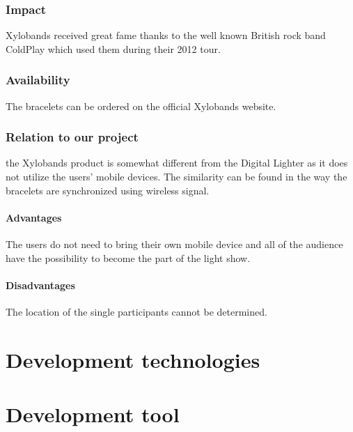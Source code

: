 \subsubsection{Impact}
Xylobands received great fame thanks to the well known British rock band ColdPlay which used them during their 2012 tour.

\subsubsection{Availability}
The bracelets can be ordered on the official Xylobands website.

\subsubsection{Relation to our project}
the Xylobands product is somewhat different from the Digital Lighter as it does not utilize the users' mobile devices. 
The similarity can be found in the way the bracelets are synchronized using wireless signal. 

\paragraph{Advantages}
The users do not need to bring their own mobile device and all of the audience have the possibility to become the part of the light show.

\paragraph{Disadvantages}
The location of the single participants cannot be determined.


\section{Development technologies}


\section{Development tool}


